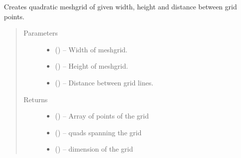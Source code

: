 \documentclass[letterpaper,10pt,english]{sphinxmanual}
\begin{document}

\begin{fulllineitems}
\label{\detokenize{image_aaap:image_aaap.build_regular_mesh}}
Creates quadratic meshgrid of given width, height and distance between
grid points.
\begin{quote}\begin{description}
\item[{Parameters}] \leavevmode\begin{itemize}
\item {} 
 () -- Width of meshgrid.

\item {} 
 () -- Height of meshgrid.

\item {} 
 () -- Distance between grid lines.

\end{itemize}

\item[{Returns}] \leavevmode
\begin{itemize}
\item {} 
 () -- Array of points of the grid

\item {} 
 () -- quads spanning the grid

\item {} 
 () -- dimension of the grid

\end{itemize}


\end{description}\end{quote}

\end{fulllineitems}

\end{document}

